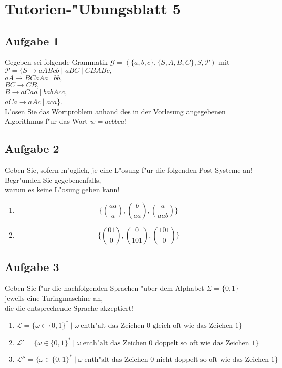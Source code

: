 \documentclass[10pt,oneside,onecolumn,a4paper,german,titlepage]{article}
\begin{document}
\section*{Tutorien-"Ubungsblatt 5}

\subsection*{Aufgabe 1}
Gegeben sei folgende Grammatik $\mathcal{G} = (\{a,b,c\},\{S,A,B,C\},S,\mathcal{P})$
mit\\
$\mathcal{P} = \{S \rightarrow aABcb \; | \; aBC \; | \; CBABc,$\\
$aA \rightarrow BCaAa \; | \; bb,$\\
$BC \rightarrow CB,$\\
$B \rightarrow aCaa \; | \; babAcc,$\\
$aCa \rightarrow aAc \; | \; aca\}$.\\[4pt]
L"osen Sie das Wortproblem anhand des in der Vorlesung angegebenen Algorithmus f"ur
das Wort $w = acbbca$!

\subsection*{Aufgabe 2}
Geben Sie, sofern m"oglich, je eine L"osung f"ur die folgenden Post-Systeme an!
Begr"unden Sie gegebenenfalls,\\
warum es keine L"osung geben kann!
\begin{enumerate}
\item \begin{displaymath} \{ {aa \choose a}, {b \choose aa}, {a \choose aab} \}
\end{displaymath}
\item \begin{displaymath} \{ {01 \choose 0}, {0 \choose 101}, {101 \choose 0} \}
\end{displaymath}
\end{enumerate}

\subsection*{Aufgabe 3}
Geben Sie f"ur die nachfolgenden Sprachen "uber dem Alphabet $\Sigma = \{0,1\}$
jeweils eine Turingmaschine an,\\
die die entsprechende Sprache akzeptiert!
\begin{enumerate}
\item $\mathcal{L} = \{ \omega \in \{0,1\}^* \; | \; \omega \;
\mbox{enth"alt das Zeichen $0$ gleich oft wie das Zeichen $1$} \}$
\item $\mathcal{L}' = \{ \omega \in \{0,1\}^* \; | \; \omega \;
\mbox{enth"alt das Zeichen $0$ doppelt so oft wie das Zeichen $1$} \}$
\item $\mathcal{L}'' = \{ \omega \in \{0,1\}^* \; | \; \omega \;
\mbox{enth"alt das Zeichen $0$ nicht doppelt so oft wie das Zeichen $1$} \}$
\end{enumerate}
\end{document}

